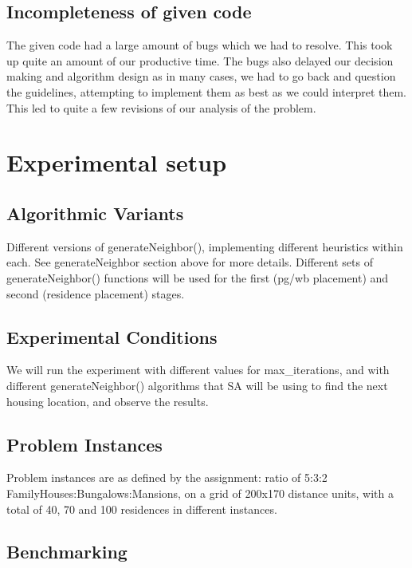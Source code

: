 \documentclass{article}
\begin{document}
\subsection{Incompleteness of given code}

The given code had a large amount of bugs which we had to resolve. This took up quite an amount of our productive time. The bugs also delayed our decision making and algorithm design as in many cases, we had to go back and question the guidelines, attempting to implement them as best as we could interpret them. This led to quite a few revisions of our analysis of the problem.

\section{Experimental setup}

\subsection{Algorithmic Variants}

Different versions of generateNeighbor(), implementing different heuristics within each. See generateNeighbor section above for more details. Different sets of generateNeighbor() functions will be used for the first (pg/wb placement) and second (residence placement) stages. 


\subsection{Experimental Conditions}

We will run the experiment with different values for max\_iterations, and with different generateNeighbor() algorithms that SA will be using to find the next housing location, and observe the results. 

\subsection{Problem Instances}

Problem instances are as defined by the assignment: ratio of 5:3:2 FamilyHouses:Bungalows:Mansions, on a grid of 200x170 distance units, with a total of 40, 70 and 100 residences in different instances. 

\subsection{Benchmarking}
\end{document}
